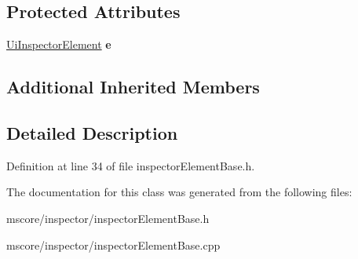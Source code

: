 \subsection*{Protected Attributes}
\begin{DoxyCompactItemize}
\item 
\mbox{\label{class_ms_1_1_inspector_element_base_ac1a8d9ba7965dfd23d7cb81f4390ff5a}} 
\hyperlink{class_ms_1_1_ui_inspector_element}{Ui\+Inspector\+Element} {\bfseries e}
\end{DoxyCompactItemize}
\subsection*{Additional Inherited Members}


\subsection{Detailed Description}


Definition at line 34 of file inspector\+Element\+Base.\+h.



The documentation for this class was generated from the following files\+:\begin{DoxyCompactItemize}
\item 
mscore/inspector/inspector\+Element\+Base.\+h\item 
mscore/inspector/inspector\+Element\+Base.\+cpp\end{DoxyCompactItemize}
